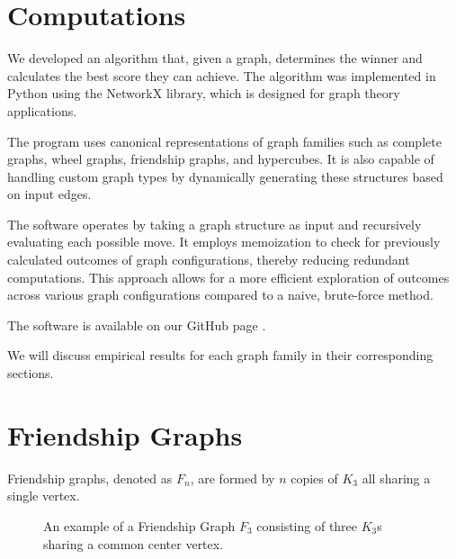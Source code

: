 \documentclass{article}
\begin{document}
\section{Computations}

We developed an algorithm that, given a graph, determines the winner and calculates the best score they can achieve. The algorithm was implemented in Python using the NetworkX library, which is designed for graph theory applications.

The program uses canonical representations of graph families such as complete graphs, wheel graphs, friendship graphs, and hypercubes. It is also capable of handling custom graph types by dynamically generating these structures based on input edges.

The software operates by taking a graph structure as input and recursively evaluating each possible move. It employs memoization to check for previously calculated outcomes of graph configurations, thereby reducing redundant computations. This approach allows for a more efficient exploration of outcomes across various graph configurations compared to a naive, brute-force method.

The software is available on our GitHub page \cite{GitHub}.

We will discuss empirical results for each graph family in their corresponding sections.

\section{Friendship Graphs}
Friendship graphs, denoted as $F_n$, are formed by $n$ copies of $K_3$ all sharing a single vertex. 

\begin{figure}[hbt!]
\centering
{}
\caption{An example of a Friendship Graph $F_3$ consisting of three $K_3$s sharing a common center vertex.}
\label{fig:friendship-graph-f3}
\end{figure}
\FloatBarrier
\end{document}
